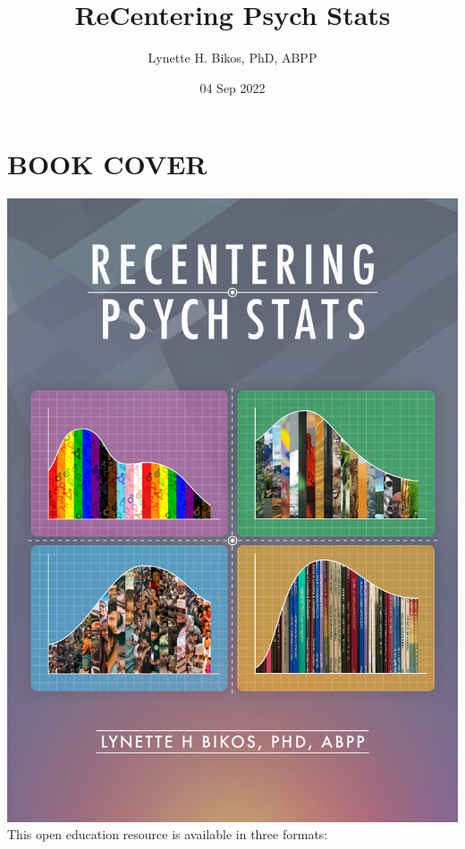 \documentclass[
  11pt,
]{book}
\title{ReCentering Psych Stats}
\author{Lynette H. Bikos, PhD, ABPP}
\date{04 Sep 2022}
\begin{document}
\maketitle

{
\hypersetup{linkcolor=}
\setcounter{tocdepth}{3}
\tableofcontents
}
\hypertarget{book-cover}{%
\chapter*{BOOK COVER}\label{book-cover}}

\includegraphics{images/ReCenterPsychStats-bookcover2.jpg}
This open education resource is available in three formats:
\end{document}
